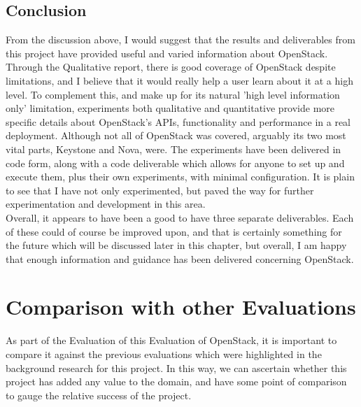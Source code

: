 \subsection{Conclusion}

From the discussion above, I would suggest that the results and deliverables from this project have provided useful and varied information about OpenStack. Through the Qualitative report, there is good coverage of OpenStack despite limitations, and I believe that it would really help a user learn about it at a high level. To complement this, and make up for its natural 'high level information only' limitation, experiments both qualitative and quantitative provide more specific details about OpenStack's APIs, functionality and performance in a real deployment. Although not all of OpenStack was covered, arguably its two most vital parts, Keystone and Nova, were. The experiments have been delivered in code form, along with a code deliverable which allows for anyone to set up and execute them, plus their own experiments, with minimal configuration. It is plain to see that I have not only experimented, but paved the way for further experimentation and development in this area. \\
Overall, it appears to have been a good to have three separate deliverables. Each of these could of course be improved upon, and that is certainly something for the future which will be discussed later in this chapter, but overall, I am happy that enough information and guidance has been delivered concerning OpenStack. 

\section{Comparison with other Evaluations}

As part of the Evaluation of this Evaluation of OpenStack, it is important to compare it against the previous evaluations which were highlighted in the background research for this project. In this way, we can ascertain whether this project has added any value to the domain, and have some point of comparison to gauge the relative success of the project. 

